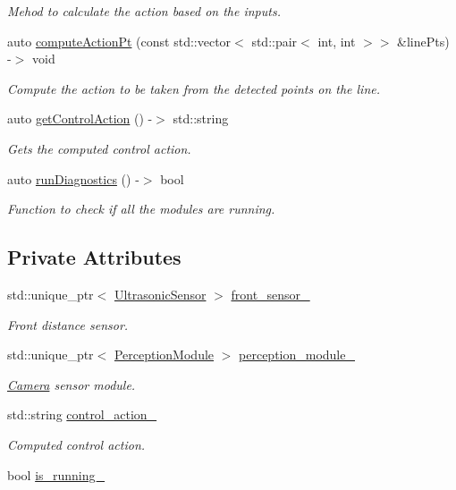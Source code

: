 \begin{DoxyCompactItemize}
\begin{DoxyCompactList}\small\item\em Mehod to calculate the action based on the inputs. \end{DoxyCompactList}\item 
auto \hyperlink{class_control_module_a8ded8dc8ebb29333bc104a26e835ce41}{compute\+Action\+Pt} (const std\+::vector$<$ std\+::pair$<$ int, int $>$$>$ \&line\+Pts) -\/$>$ void
\begin{DoxyCompactList}\small\item\em Compute the action to be taken from the detected points on the line. \end{DoxyCompactList}\item 
auto \hyperlink{class_control_module_af623430925750c3124253b705593cdce}{get\+Control\+Action} () -\/$>$ std\+::string
\begin{DoxyCompactList}\small\item\em Gets the computed control action. \end{DoxyCompactList}\item 
auto \hyperlink{class_control_module_a10094a24e4e1e674da0bb5d0f1ef5e58}{run\+Diagnostics} () -\/$>$ bool
\begin{DoxyCompactList}\small\item\em Function to check if all the modules are running. \end{DoxyCompactList}\end{DoxyCompactItemize}
\subsection*{Private Attributes}
\begin{DoxyCompactItemize}
\item 
std\+::unique\+\_\+ptr$<$ \hyperlink{class_ultrasonic_sensor}{Ultrasonic\+Sensor} $>$ \hyperlink{class_control_module_ad446c4323ea97a807a9b355c2f121a20}{front\+\_\+sensor\+\_\+}
\begin{DoxyCompactList}\small\item\em Front distance sensor. \end{DoxyCompactList}\item 
std\+::unique\+\_\+ptr$<$ \hyperlink{class_perception_module}{Perception\+Module} $>$ \hyperlink{class_control_module_a179995b24b2400b72b2cfd079b576782}{perception\+\_\+module\+\_\+}
\begin{DoxyCompactList}\small\item\em \hyperlink{class_camera}{Camera} sensor module. \end{DoxyCompactList}\item 
std\+::string \hyperlink{class_control_module_acf268f1e0e9d27bff61e89c681a739a3}{control\+\_\+action\+\_\+}
\begin{DoxyCompactList}\small\item\em Computed control action. \end{DoxyCompactList}\item 
bool \hyperlink{class_control_module_af48419a814c008e4695bef60daf2a516}{is\+\_\+running\+\_\+}
\end{DoxyCompactItemize}


